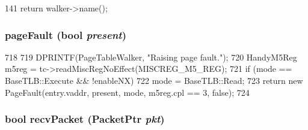 \begin{DoxyCode}
141 {return walker->name();}
\end{DoxyCode}
\hypertarget{classX86ISA_1_1Walker_1_1WalkerState_aea73109ca1147453cb802d6102c1074a}{
\subsubsection[{pageFault}]{ pageFault (bool {\em present})}}
\label{classX86ISA_1_1Walker_1_1WalkerState_aea73109ca1147453cb802d6102c1074a}



\begin{DoxyCode}
718 {
719     DPRINTF(PageTableWalker, "Raising page fault.\n");
720     HandyM5Reg m5reg = tc->readMiscRegNoEffect(MISCREG_M5_REG);
721     if (mode == BaseTLB::Execute && !enableNX)
722         mode = BaseTLB::Read;
723     return new PageFault(entry.vaddr, present, mode, m5reg.cpl == 3, false);
724 }
\end{DoxyCode}
\hypertarget{classX86ISA_1_1Walker_1_1WalkerState_ac6c4ea75aa4bd19a760aca940fad8876}{
\subsubsection[{recvPacket}]{\setlength{\rightskip}{0pt plus 5cm}bool recvPacket ({\bf PacketPtr} {\em pkt})}}
\label{classX86ISA_1_1Walker_1_1WalkerState_ac6c4ea75aa4bd19a760aca940fad8876}



